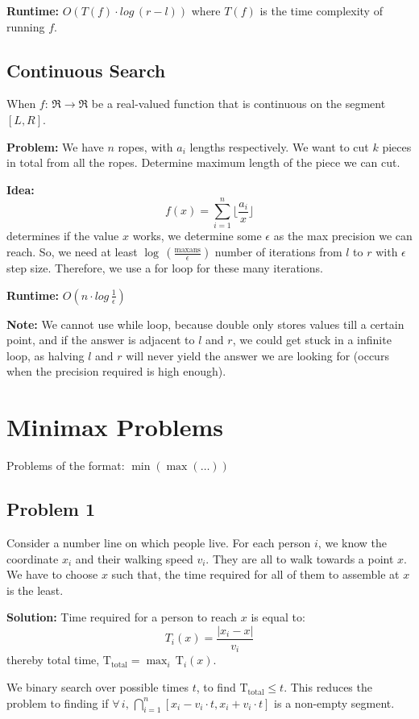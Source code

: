 \documentclass{article}
\begin{document}
	\textbf{Runtime:} $O(T(f) \cdot log \, (r-l))$ where $T(f)$ is the time complexity of running $f$.
	
	\subsection{Continuous Search}
	When $f: \, \Re \rightarrow \Re$ be a real-valued function that is continuous on the segment $[L,R]$. \newline
	
	\textbf{Problem:} We have $n$ ropes, with $a_i$ lengths respectively. We want to cut $k$ pieces in total from all the ropes. Determine maximum length of the piece we can cut. \newline
	
	\textbf{Idea:} \[\displaystyle f(x) = \sum_{i=1}^{n} \lfloor \frac{a_i}{x} \rfloor\]
	determines if the value $x$ works, we determine some $\epsilon$ as the max precision we can reach. So, we need at least $\log \, (\frac{\text{maxans}}{\epsilon})$ number of iterations from $l$ to $r$ with $\epsilon$ step size. Therefore, we use a for loop for these many iterations. \newline
	
	\textbf{Runtime:} $\displaystyle O(n \cdot log \, \frac{1}{\epsilon})$ \newline
	
	\textbf{Note:} We cannot use while loop, because double only stores values till a certain point, and if the answer is adjacent to $l$ and $r$, we could get stuck in a infinite loop, as halving $l$ and $r$ will never yield the answer we are looking for (occurs when the precision required is high enough).
	
	\section{Minimax Problems}
	Problems of the format: $\min(\max(\ldots))$
	\subsection{Problem 1}
	Consider a number line on which people live. For each person $i$, we know the coordinate $x_i$ and their walking speed $v_i$. They are all to walk towards a point $x$. We have to choose $x$ such that, the time required for all of them to assemble at $x$ is the least. \newline
	
	\textbf{Solution:} Time required for a person to reach $x$ is equal to: 
	\[
	T_i(x) = \frac{\lvert x_i - x \rvert}{v_i}
	\]
	thereby total time, $\text{T}_{\text{total}} = \max_i \, \text{T}_i(x)$. \newline
	
	We binary search over possible times $t$, to find $\text{T}_{\text{total}} \leq t$. This reduces the problem to finding if $\forall \, i, \, \bigcap_{i=1}^n [x_i - v_i \cdot t, x_i + v_i \cdot t]$ is a non-empty segment.
	
\end{document}
